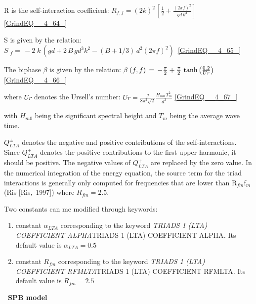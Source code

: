 R is the self-interaction coefficient: $R_{f,f} =\left(2k\right)^{2} \, \left[\frac{1}{2} +\frac{\left(2\pi f\right)^{2} }{gd\, k^{2} } \right]$ \eqref{GrindEQ__4_64_}

S is given by the relation: $S\; _{f} =\, -2\; k\, \left(gd+2\, B\, gd^{3} k_{}^{2} -(B+1/3)\, d^{2} \left(2\pi f\right)_{}^{2} \right)\, $ \eqref{GrindEQ__4_65_}

The biphase $\beta $ is given by the relation: $\beta {\kern 1pt} \left(f,f\right)\, =\, -\frac{\pi }{2} +\frac{\pi }{2} \, \tanh \left(\frac{0.2}{Ur} \right)$ \eqref{GrindEQ__4_66_}

where $Ur$ denotes the Ursell's number: $Ur=\frac{g}{8\pi ^{2} \sqrt{2} } \frac{H_{m0} \, T_{m}^{2} }{d^{2} } $ \eqref{GrindEQ__4_67_}

 with $H_{m0} $ being the significant spectral height and $T_{m} $ being the average wave time.

 $Q_{LTA}^{\pm } $ denotes the negative and positive contributions of the self-interactions. Since $Q_{LTA}^{+} $ denotes the positive contributions to the first upper harmonic, it should be positive. The negative values of $Q_{LTA}^{+} $ are replaced by the zero value. In the numerical integration of the energy equation, the source term for the triad interactions is generally only computed for frequencies that are lower than R${}_{fm}$f${}_{m}$ (Ris [Ris,~1997]) where $R_{fm} =2.5$.

 Two constants can me modified through keywords:

\begin{enumerate}
\item  constant $\alpha _{LTA} $ corresponding to the keyword \textit{TRIADS 1 (LTA) COEFFICIENT ALPHA}TRIADS 1 (LTA) COEFFICIENT ALPHA\textit{.} Its default value is $\alpha _{LTA} =0.5$

\item  constant $R_{fm} $ corresponding to the keyword \textit{TRIADS 1 (LTA) COEFFICIENT RFMLTA}TRIADS 1 (LTA) COEFFICIENT RFMLTA\textit{.} Its default value is $R_{fm} =2.5$
\end{enumerate}


{\bf  ~SPB model}


